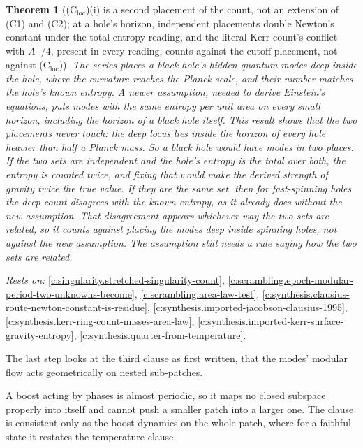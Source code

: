 \documentclass[11pt]{article}
\newtheorem{theorem}{Theorem}[section]
\theoremstyle{definition}
\theoremstyle{plain}
\begin{document}
\begin{theorem}[(C$_{\mathrm{loc}}$)(i) is a second placement of the count, not an extension of (C1) and (C2); at a hole's horizon, independent placements double Newton's constant under the total-entropy reading, and the literal Kerr count's conflict with $A_{+}/4$, present in every reading, counts against the cutoff placement, not against (C$_{\mathrm{loc}}$)]\label{c:synthesis.c-loc-is-a-second-placement-of-the-count}
The series places a black hole's hidden quantum modes deep inside the hole, where the curvature reaches the Planck scale, and their number matches the hole's known entropy. A newer assumption, needed to derive Einstein's equations, puts modes with the same entropy per unit area on every small horizon, including the horizon of a black hole itself. This result shows that the two placements never touch: the deep locus lies inside the horizon of every hole heavier than half a Planck mass. So a black hole would have modes in two places. If the two sets are independent and the hole's entropy is the total over both, the entropy is counted twice, and fixing that would make the derived strength of gravity twice the true value. If they are the same set, then for fast-spinning holes the deep count disagrees with the known entropy, as it already does without the new assumption. That disagreement appears whichever way the two sets are related, so it counts against placing the modes deep inside spinning holes, not against the new assumption. The assumption still needs a rule saying how the two sets are related.
\end{theorem}
\noindent\emph{Rests on:} \ref{c:singularity.stretched-singularity-count}, \ref{c:scrambling.epoch-modular-period-two-unknowns-become}, \ref{c:scrambling.area-law-test}, \ref{c:synthesis.clausius-route-newton-constant-is-residue}, \ref{c:synthesis.imported-jacobson-clausius-1995}, \ref{c:synthesis.kerr-ring-count-misses-area-law}, \ref{c:synthesis.imported-kerr-surface-gravity-entropy}, \ref{c:synthesis.quarter-from-temperature}.

The last step looks at the third clause as first written, that the modes' modular flow acts geometrically on nested sub-patches.

A boost acting by phases is almost periodic, so it maps no closed subspace properly into itself and cannot push a smaller patch into a larger one. The clause is consistent only as the boost dynamics on the whole patch, where for a faithful state it restates the temperature clause.
\end{document}
